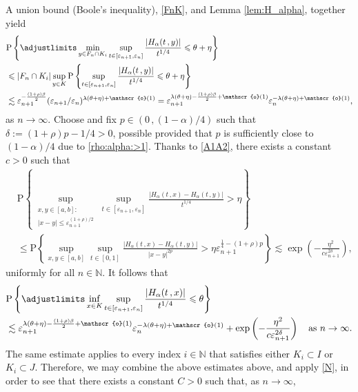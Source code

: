 \documentclass[reqno]{amsart}
\newcommand{\<}{\langle}
\renewcommand{\>}{\rangle}
\newcommand{\N}{\mathbb{N}}
\renewcommand{\P}{\mathrm{P}}
\newcommand{\1}{\mathbb{1}}
\renewcommand{\le}{\leqslant}
\theoremstyle{definition}
\numberwithin{equation}{section}
\begin{document}
A union bound (Boole's inequality), \eqref{FnK}, and Lemma \ref{lem:H_alpha}, 
together yield
\begin{align*}
	&\P\left\{ \adjustlimits\min_{y \in F_n \cap K_i} \sup_{t \in [\varepsilon_{n+1},\varepsilon_n]}
		\frac{|H_\alpha(t\,,y)|}{t^{1/4}} \le \theta + \eta \right\}\\
	& \le |F_n \cap K_i| \sup_{y \in K} \P\left\{ 
		\sup_{t \in [\varepsilon_{n+1},\varepsilon_n]} 
		\frac{|H_\alpha(t\,,y)|}{t^{1/4}} \le \theta + \eta \right\}\\
	&\lesssim \varepsilon_{n+1}^{-\frac{(1+\rho)\beta}{2}}
		(\varepsilon_{n+1}/\varepsilon_n)^{\lambda(\theta+\eta) + \mathscr{o}(1)}
		= \varepsilon_{n+1}^{\lambda(\theta+\eta)-\frac{(1+\rho)\beta}{2} 
		+ \mathscr{o}(1)} \varepsilon_n^{-\lambda(\theta+\eta) + \mathscr{o}(1)},
\end{align*}
as $n \to \infty$.
Choose and fix $p \in (0\,,(1-\alpha)/4)$ such that $\delta :=  (1+\rho)p -1/4>0$, 
possible provided that $p$ is sufficiently close to $(1-\alpha)/4$ due to \eqref{rho:alpha:>1}.
Thanks to \eqref{A1A2}, there exists a constant $c>0$ such that
\begin{align*}
	&\P\left\{ \sup_{\substack{x,y \in [a,b]:\\ |x-y| \le \varepsilon_{n+1}^{(1+\rho)/2}}}
		\sup_{t \in [\varepsilon_{n+1},\varepsilon_n]}
		\frac{|H_\alpha(t\,,x) - H_\alpha(t\,,y)|}{t^{1/4}} > \eta \right\}\\
	&\le \P\left\{ \sup_{x,y \in [a,b]} \sup_{t \in [0,1]}
		\frac{|H_\alpha(t\,,x) - H_\alpha(t\,,y)|}{|x-y|^{2p}} > \eta 
		\varepsilon_{n+1}^{\frac14 - (1+\rho)p}\right\}
		\lesssim \exp\left( - \frac{\eta^2}{c \varepsilon_{n+1}^{2\delta}} \right),
\end{align*}
uniformly for all $n \in \N$.
It follows that
\begin{align*}
	&\P\left\{ \adjustlimits
		\inf_{x \in K} \sup_{t \in [\varepsilon_{n+1},\varepsilon_n]}
		\frac{|H_\alpha(t\,,x)|}{t^{1/4}} \le \theta \right\}\\
	&\lesssim \varepsilon_{n+1}^{\lambda(\theta+\eta)-\frac{(1+\rho)\beta}{2}
		+ \mathscr{o}(1)} \varepsilon_n^{-\lambda(\theta+\eta) + \mathscr{o}(1)}
		 + \exp\left(- \frac{\eta^2 }{c\varepsilon_{n+1}^{2\delta}}\right)
		\quad\text{as $n \to \infty$.}
\end{align*}
The same estimate applies to every index $i\in\N$ that satisfies either
$K_i \subset I$ or $K_i \subset J$.
Therefore, we may combine the above estimates above, and apply \eqref{N}, 
in order to see that there exists a constant $C>0$ such that, as $n\to\infty$,
\end{document}
